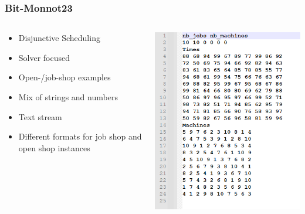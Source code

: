 \documentclass[dvipsnames,aspectratio=169]{beamer}
\begin{document}
\begin{frame}
\frametitle{Bit-Monnot23 \cite{Bit-Monnot23}}
\begin{columns}
\begin{column}{0.5\textwidth}
\begin{itemize}
\item Disjunctive Scheduling
\item Solver focused
\item Open-/job-shop examples
\item Mix of strings and numbers
\item Text stream
\item Different formats for job shop and open shop instances
\end{itemize}
\end{column}
\begin{column}{0.5\textwidth}
\includegraphics[width=.7\textwidth]{images/Bit-Monnot23}
\end{column}
\end{columns}
\end{frame}
\end{document}

